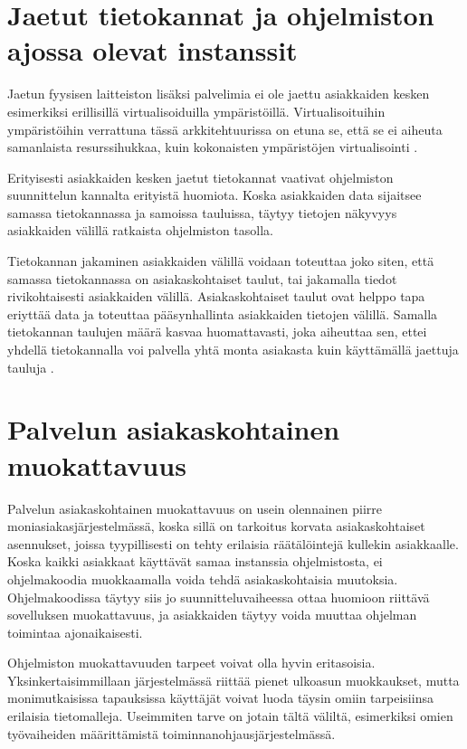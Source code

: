 \section{Jaetut tietokannat ja ohjelmiston ajossa olevat instanssit}
Jaetun fyysisen laitteiston lisäksi palvelimia ei ole jaettu asiakkaiden kesken esimerkiksi erillisillä virtualisoiduilla ympäristöillä. Virtualisoituihin ympäristöihin verrattuna tässä arkkitehtuurissa on etuna se, että se ei aiheuta samanlaista resurssihukkaa, kuin kokonaisten ympäristöjen virtualisointi \cite{huber2011evaluating}.

Erityisesti asiakkaiden kesken jaetut tietokannat vaativat ohjelmiston suunnittelun kannalta erityistä huomiota. Koska asiakkaiden data sijaitsee samassa tietokannassa ja samoissa tauluissa, täytyy tietojen näkyvyys asiakkaiden välillä ratkaista ohjelmiston tasolla.

Tietokannan jakaminen asiakkaiden välillä voidaan toteuttaa joko siten, että samassa tietokannassa on asiakaskohtaiset taulut, tai jakamalla tiedot rivikohtaisesti asiakkaiden välillä. Asiakaskohtaiset taulut ovat helppo tapa eriyttää data ja toteuttaa pääsynhallinta asiakkaiden tietojen välillä. Samalla tietokannan taulujen määrä kasvaa huomattavasti, joka aiheuttaa sen, ettei yhdellä tietokannalla voi palvella yhtä monta asiakasta kuin käyttämällä jaettuja tauluja \cite{chong2006multi}.

\section{Palvelun asiakaskohtainen muokattavuus}
Palvelun asiakaskohtainen muokattavuus on usein olennainen piirre moniasiakasjärjestelmässä, koska sillä on tarkoitus korvata asiakaskohtaiset asennukset, joissa tyypillisesti on tehty erilaisia räätälöintejä kullekin asiakkaalle. Koska kaikki asiakkaat käyttävät samaa instanssia ohjelmistosta, ei ohjelmakoodia muokkaamalla voida tehdä asiakaskohtaisia muutoksia. Ohjelmakoodissa täytyy siis jo suunnitteluvaiheessa ottaa huomioon riittävä sovelluksen muokattavuus, ja asiakkaiden täytyy voida muuttaa ohjelman toimintaa ajonaikaisesti.

Ohjelmiston muokattavuuden tarpeet voivat olla hyvin eritasoisia. Yksinkertaisimmillaan järjestelmässä riittää pienet ulkoasun muokkaukset, mutta monimutkaisissa tapauksissa käyttäjät voivat luoda täysin omiin tarpeisiinsa erilaisia tietomalleja. Useimmiten tarve on jotain tältä väliltä, esimerkiksi omien työvaiheiden määrittämistä toiminnanohjausjärjestelmässä.

